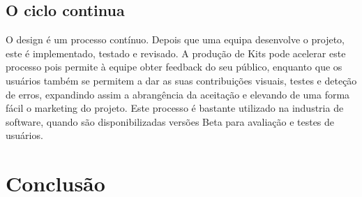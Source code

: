 \documentclass[twoside,twocolumn]{article}
\begin{document}
\subsection{O ciclo continua}
\indent O design é um processo contínuo. Depois que uma equipa desenvolve o projeto, este é implementado, testado e revisado. A produção de Kits pode acelerar este processo pois permite à equipe obter feedback do seu público, enquanto que os usuários também se permitem a dar as suas contribuições visuais, testes e deteção de erros, expandindo assim a abrangência da aceitação e elevando de uma forma fácil o marketing do projeto. \citep{EllenLupton2013}
\newline \indent Este processo é bastante utilizado na industria de software, quando são disponibilizadas versões Beta para avaliação e testes de usuários.


\section{Conclusão}
\end{document}
